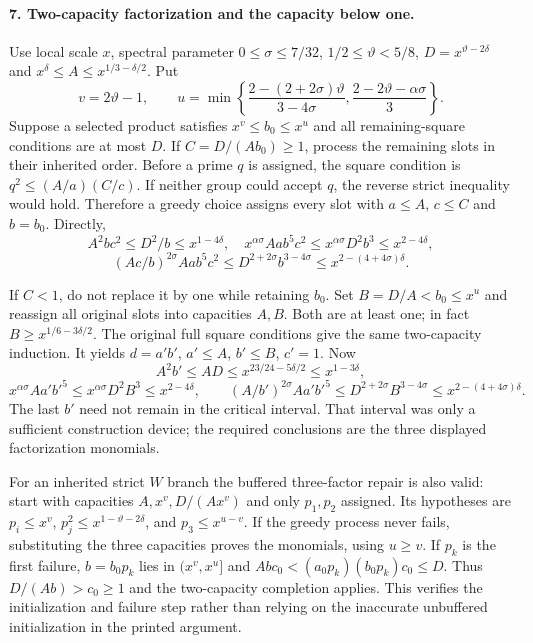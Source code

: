\paragraph{7. Two-capacity factorization and the capacity below one.}
Use local scale $x$, spectral parameter $0\le\sigma\le7/32$,
$1/2\le\vartheta<5/8$, $D=x^{\vartheta-2\delta}$ and
$x^\delta\le A\le x^{1/3-\delta/2}$. Put
\[
 v=2\vartheta-1,\qquad
 u=\min\left\{\frac{2-(2+2\sigma)\vartheta}{3-4\sigma},
                 \frac{2-2\vartheta-\alpha\sigma}{3}\right\}.
\]
Suppose a selected product satisfies $x^v\le b_0\le x^u$ and all
remaining-square conditions are at most $D$. If $C=D/(Ab_0)\ge1$,
process the remaining slots in their inherited order. Before a prime
$q$ is assigned, the square condition is
$q^2\le(A/a)(C/c)$. If neither group could accept $q$, the reverse
strict inequality would hold. Therefore a greedy choice assigns
every slot with $a\le A$, $c\le C$ and $b=b_0$. Directly,
\[
 A^2bc^2\le D^2/b\le x^{1-4\delta},\quad
 x^{\alpha\sigma}Aab^5c^2\le x^{\alpha\sigma}D^2b^3
                          \le x^{2-4\delta},
\]
\[
 (Ac/b)^{2\sigma}Aab^5c^2
 \le D^{2+2\sigma}b^{3-4\sigma}
 \le x^{2-(4+4\sigma)\delta}.
\]

If $C<1$, do not replace it by one while retaining $b_0$. Set
$B=D/A<b_0\le x^u$ and reassign all original slots into capacities
$A,B$. Both are at least one; in fact
$B\ge x^{1/6-3\delta/2}$. The original full square conditions give
the same two-capacity induction. It yields $d=a'b'$, $a'\le A$,
$b'\le B$, $c'=1$. Now
\[
 A^2b'\le AD\le x^{23/24-5\delta/2}\le x^{1-3\delta},
\]
\[
 x^{\alpha\sigma}Aa'b'^5\le x^{\alpha\sigma}D^2B^3
 \le x^{2-4\delta},\qquad
 (A/b')^{2\sigma}Aa'b'^5
 \le D^{2+2\sigma}B^{3-4\sigma}
 \le x^{2-(4+4\sigma)\delta}.
\]
The last $b'$ need not remain in the critical interval. That interval
was only a sufficient construction device; the required conclusions
are the three displayed factorization monomials.

For an inherited strict $W$ branch the buffered three-factor repair
is also valid: start with capacities $A,x^v,D/(Ax^v)$ and only
$p_1,p_2$ assigned. Its hypotheses are $p_i\le x^v$,
$p_j^2\le x^{1-\vartheta-2\delta}$, and $p_3\le x^{u-v}$.
If the greedy process never fails, substituting the three capacities
proves the monomials, using $u\ge v$. If $p_k$ is the first failure,
$b=b_0p_k$ lies in $(x^v,x^u]$ and
$Abc_0<(a_0p_k)(b_0p_k)c_0\le D$.
Thus $D/(Ab)>c_0\ge1$ and the two-capacity completion applies.
This verifies the initialization and failure step rather than relying
on the inaccurate unbuffered initialization in the printed argument.


